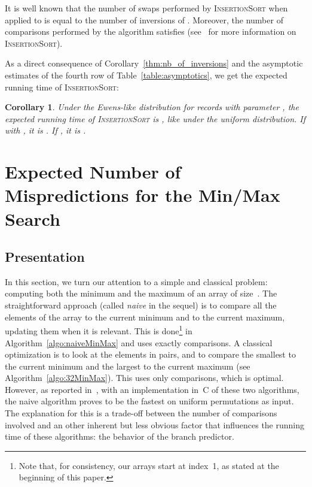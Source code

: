 \documentclass[proceedings]{aofa}
\newcommand{\InsertSort}{\textsc{InsertionSort}\xspace}
\newtheorem{corollary}[theorem]{Corollary}
\begin{document}
It is well known that the number of swaps performed by \InsertSort when applied to  is equal to the number of inversions  of . 
Moreover, the number of comparisons  performed by the algorithm satisfies  
(see~\cite{CoLeRi01} for more information on \InsertSort).

As a direct consequence of Corollary~\ref{thm:nb_of_inversions} and the asymptotic estimates of the fourth row of Table~\ref{table:asymptotics}, 
we get the expected running time of \InsertSort:
\begin{corollary}\label{cor:insert sort}
Under the Ewens-like distribution for records with parameter , the expected running time of \InsertSort is , like under the uniform distribution. 
If  with , it is . If , it is .
\end{corollary}

\section{Expected Number of Mispredictions for the Min/Max Search}\label{sec:mispredictions}

\subsection{Presentation}\label{sec:presentation}
In this section, we turn our attention to a simple and classical problem: computing both the minimum and the maximum of an array of size~. The straightforward approach (called {\em naive} in the sequel) is to compare all the elements of the array to the current minimum and to the current maximum, updating them when it is relevant. This is done\footnote{Note that, for consistency, our arrays start at index~1, as stated at the beginning of this paper.} in Algorithm~\ref{algo:naiveMinMax} and uses exactly  comparisons.
A classical optimization is to look at the elements in pairs, and to compare the smallest to the current minimum and the largest to the current maximum (see Algorithm~\ref{algo:32MinMax}). This uses only  comparisons, which is optimal.
However, as reported in~\cite{AuNiPi16}, with an implementation in~C of these two algorithms, the naive algorithm proves to be the fastest on uniform permutations as input. The explanation for this is a trade-off between the number of comparisons involved and an other inherent but less obvious factor that influences the running time of these algorithms: the behavior of the branch predictor.
\end{document}
